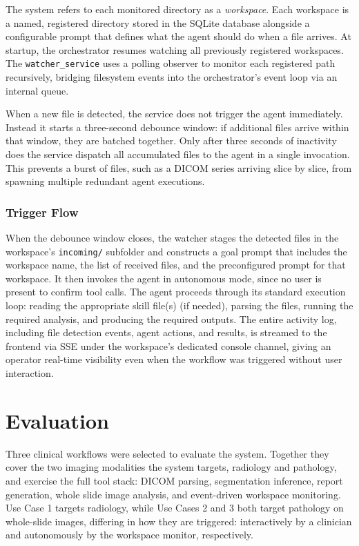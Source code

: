\documentclass[conference]{IEEEtran}
\begin{document}
The system refers to each monitored directory as a \textit{workspace}. Each workspace is a named, registered directory stored in the SQLite database alongside a configurable prompt that defines what the agent should do when a file arrives. At startup, the orchestrator resumes watching all previously registered workspaces.
The \texttt{watcher\_service} uses a polling observer to monitor each registered path recursively, bridging filesystem events into the orchestrator's event loop via an internal queue.

When a new file is detected, the service does not trigger the agent immediately. Instead it starts a three-second debounce window: if additional files arrive within that window, they are batched together. Only after three seconds of inactivity does the service dispatch all accumulated files to the agent in a single invocation. This prevents a burst of files, such as a DICOM series arriving slice by slice, from spawning multiple redundant agent executions.

\subsubsection{Trigger Flow}

When the debounce window closes, the watcher stages the detected files in the workspace's \texttt{incoming/} subfolder and constructs a goal prompt that includes the workspace name, the list of received files, and the preconfigured prompt for that workspace. It then invokes the agent in autonomous mode, since no user is present to confirm tool calls.
The agent proceeds through its standard execution loop: reading the appropriate skill file(s) (if needed), parsing the files, running the required analysis, and producing the required outputs. The entire activity log, including file detection events, agent actions, and results, is streamed to the frontend via SSE under the workspace's dedicated console channel, giving an operator real-time visibility even when the workflow was triggered without user interaction.


\section{Evaluation}
\label{sec:evaluation}

Three clinical workflows were selected to evaluate the system. Together they cover the two imaging modalities the system targets, radiology and pathology, and exercise the full tool stack: DICOM parsing, segmentation inference, report generation, whole slide image analysis, and event-driven workspace monitoring. Use Case 1 targets radiology, while Use Cases 2 and 3 both target pathology on whole-slide images, differing in how they are triggered: interactively by a clinician and autonomously by the workspace monitor, respectively.
\end{document}

